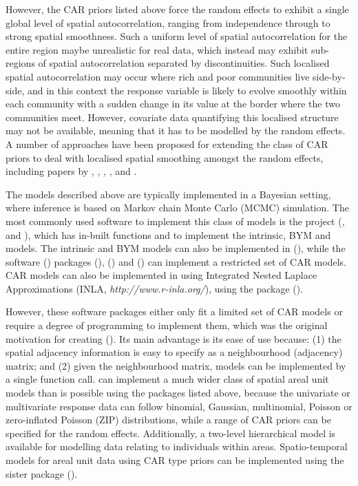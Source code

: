 \documentclass[article,shortnames,nojss]{jss}
\begin{document}
\hspace{1cm} However, the CAR priors listed above force the random effects to exhibit a single global level of spatial autocorrelation, ranging from independence through to strong spatial smoothness. Such a uniform level of spatial autocorrelation for the entire region maybe unrealistic for real data, which instead may exhibit sub-regions of spatial autocorrelation separated by discontinuities. Such localised spatial autocorrelation may occur where rich and poor communities live side-by-side, and in this context the response variable is likely to evolve smoothly within each community with a sudden change in its value at the border where the two communities meet. However, covariate data quantifying this localised structure may not be available, meaning that it has to be modelled by the random effects. A number of approaches have been proposed for extending the class of CAR priors to deal with localised spatial smoothing amongst the random effects, including papers by \cite{lawson2002}, \cite{brewer2007},  \cite{lu2007}, \cite{lee2012}, and \cite{lee2014}.

\hspace{1cm} The models described above are typically implemented in a Bayesian setting, where inference is based on Markov chain Monte Carlo (MCMC) simulation. The most commonly used software to implement this class of models is the  project (\cite{lunn2009},  and ), which has in-built functions  and  to implement the intrinsic, BYM and \cite{stern1999} models. The intrinsic and BYM models can also be implemented in  (\cite{belitz2009}), while the  software (\citealp{R}) packages  (\citealp{hSDM}),  (\citealp{schabenberger2009}) and  (\citealp{bivand2013}) can implement a restricted set of CAR models. CAR models can also be implemented in  using Integrated Nested Laplace Approximations (INLA, \emph{http://www.r-inla.org/}), using the package  (\citealp{rue2009}).

\hspace{1cm} However, these software packages either only fit a limited set of CAR models or require a degree of programming to implement them, which was the original motivation for creating  (\citealp{lee2013}). Its main advantage is its ease of use because: (1) the spatial adjacency information is easy to specify as a neighbourhood (adjacency) matrix; and (2) given the neighbourhood matrix, models can be implemented by a single function call.  can implement a much wider class of spatial areal unit models than is possible using the  packages listed above, because the univariate or multivariate response data can follow binomial, Gaussian, multinomial, Poisson or zero-inflated Poisson (ZIP) distributions, while a range of CAR priors can be specified for the random effects. Additionally, a two-level hierarchical model is available for modelling data relating to individuals within areas. Spatio-temporal models for areal unit data using CAR type priors can be implemented using the sister package  (\citealp{carbayesst}).
\end{document}
